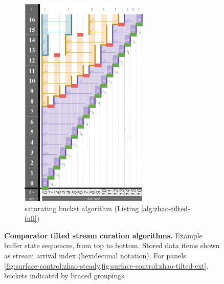 \begin{figure}
\begin{subfigure}{0.32\linewidth}
\end{subfigure}%
\begin{subfigure}{0.32\linewidth}
\centering
\includegraphics[height=4in,trim={2.5cm 0 0 0},clip]{img/surface-control-tall-zhao-full}
\centering
\caption{saturating bucket algorithm (Listing \ref{alg:zhao-tilted-full})}
\label{fig:surface-control-tilted:saturating-bucket}
\end{subfigure}

\caption{%
\textbf{Comparator tilted stream curation algorithms.}
\footnotesize
Example buffer state sequences, from top to bottom.
Stored data items shown as stream arrival index (hexidecimal notation).
For panels \cref{fig:surface-control:zhao-steady,fig:surface-control:zhao-tilted-ext}, buckets indicated by braced groupings.
}
\label{fig:surface-control-tilted}

\end{figure}
